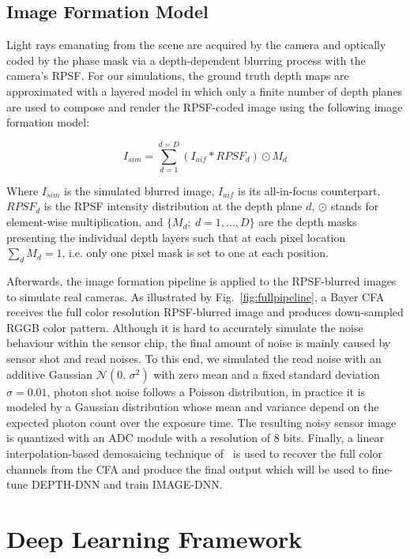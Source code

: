 \documentclass[preprint,5p,twocolumn]{elsarticle}
\begin{document}
\subsection{Image Formation Model}
\label{sec:image_formation}
Light rays emanating  from the scene are acquired by the camera and optically coded by the phase mask via a depth-dependent blurring process with the camera's RPSF. For our simulations, the ground truth depth maps are approximated with a layered model in which only a finite number of depth planes are used to compose and render the RPSF-coded image using the following image formation model:

\begin{equation}
\label{18}
    I_{sim}=\sum_{d=1}^{d=D}(I_{aif}*RPSF_{d})\odot M_{d}
\end{equation}

Where $I_{sim}$ is the simulated blurred image, $I_{aif}$ is its all-in-focus counterpart, $RPSF_{d}$ is the RPSF intensity distribution at the depth plane $d$, $\odot$ stands for element-wise multiplication, and $\{M_{d};~d=1,...,D\}$ are the depth masks presenting the individual depth layers such that at each pixel location $\sum_{d}M_{d}=1$, i.e. only one pixel mask is set to one at each position. 


Afterwards, the image formation pipeline is applied to the RPSF-blurred images to simulate real cameras. 
As illustrated by Fig.~\ref{fig:fullpipeline}, a Bayer CFA receives the full color resolution RPSF-blurred image and produces down-sampled RGGB color pattern. Although it is hard to accurately simulate the noise behaviour within the sensor chip, the final amount of noise is mainly caused by sensor shot and read noises. To this end, we simulated the read noise with an additive Gaussian $\mathcal{N}(0,\,\sigma^{2})$ with zero mean and a fixed standard deviation $\sigma=0.01$, photon shot noise follows a Poisson distribution, in practice it is modeled by a Gaussian distribution whose mean and variance depend on the expected photon count over the exposure time. The resulting noisy sensor image is quantized with an ADC module with a resolution of 8 bits. Finally, a linear interpolation-based demosaicing technique of~\cite{malvar2004high} is used to recover the full color channels from the CFA and produce the final output which will be used to fine-tune DEPTH-DNN and train IMAGE-DNN.

 
\section{Deep Learning Framework}
\label{sec:learning}
\end{document}
